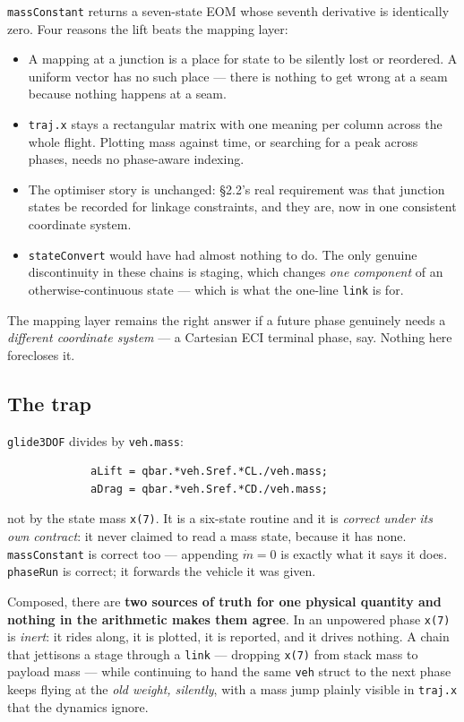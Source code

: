 \documentclass[11pt]{article}
\newcommand{\code}[1]{\texttt{#1}}
\begin{document}
\code{massConstant} returns a seven-state EOM whose seventh derivative is
identically zero. Four reasons the lift beats the mapping layer:

\begin{itemize}
\item A mapping at a junction is a place for state to be silently lost or
reordered. A uniform vector has no such place --- there is nothing to get wrong
at a seam because nothing happens at a seam.
\item \code{traj.x} stays a rectangular matrix with one meaning per column
across the whole flight. Plotting mass against time, or searching for a peak
across phases, needs no phase-aware indexing.
\item The optimiser story is unchanged: \S2.2's real requirement was that
junction states be recorded for linkage constraints, and they are, now in one
consistent coordinate system.
\item \code{stateConvert} would have had almost nothing to do. The only genuine
discontinuity in these chains is staging, which changes \emph{one component} of
an otherwise-continuous state --- which is what the one-line \code{link} is
for.
\end{itemize}

The mapping layer remains the right answer if a future phase genuinely needs a
\emph{different coordinate system} --- a Cartesian ECI terminal phase, say.
Nothing here forecloses it.

\subsection{The trap}

\code{glide3DOF} divides by \code{veh.mass}:

\begin{lstlisting}
             aLift = qbar.*veh.Sref.*CL./veh.mass;
             aDrag = qbar.*veh.Sref.*CD./veh.mass;
\end{lstlisting}

not by the state mass \code{x(7)}. It is a six-state routine and it is
\emph{correct under its own contract}: it never claimed to read a mass state,
because it has none. \code{massConstant} is correct too --- appending
$\dot m = 0$ is exactly what it says it does. \code{phaseRun} is correct; it
forwards the vehicle it was given.

Composed, there are \textbf{two sources of truth for one physical quantity and
nothing in the arithmetic makes them agree}. In an unpowered phase \code{x(7)}
is \emph{inert}: it rides along, it is plotted, it is reported, and it drives
nothing. A chain that jettisons a stage through a \code{link} --- dropping
\code{x(7)} from stack mass to payload mass --- while continuing to hand the
same \code{veh} struct to the next phase keeps flying at the \emph{old weight,
silently}, with a mass jump plainly visible in \code{traj.x} that the dynamics
ignore.
\end{document}
